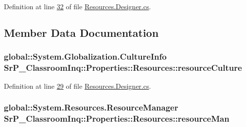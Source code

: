 \-Definition at line \hyperlink{_resources_8_designer_8cs_source_l00032}{32} of file \hyperlink{_resources_8_designer_8cs_source}{\-Resources.\-Designer.\-cs}.



\subsection{\-Member \-Data \-Documentation}
\hypertarget{class_sr_p___classroom_inq_1_1_properties_1_1_resources_a022040216319d6d3cdc26fe2af7fdc7a}{
\subsubsection[{resource\-Culture}]{\setlength{\rightskip}{0pt plus 5cm}global\-::\-System.\-Globalization.\-Culture\-Info {\bf \-Sr\-P\-\_\-\-Classroom\-Inq\-::\-Properties\-::\-Resources\-::resource\-Culture}}}
\label{class_sr_p___classroom_inq_1_1_properties_1_1_resources_a022040216319d6d3cdc26fe2af7fdc7a}


\-Definition at line \hyperlink{_resources_8_designer_8cs_source_l00029}{29} of file \hyperlink{_resources_8_designer_8cs_source}{\-Resources.\-Designer.\-cs}.

\hypertarget{class_sr_p___classroom_inq_1_1_properties_1_1_resources_ae22dad3e6078a39a90778bb00e89e1c6}{
\subsubsection[{resource\-Man}]{\setlength{\rightskip}{0pt plus 5cm}global\-::\-System.\-Resources.\-Resource\-Manager {\bf \-Sr\-P\-\_\-\-Classroom\-Inq\-::\-Properties\-::\-Resources\-::resource\-Man}}}
\label{class_sr_p___classroom_inq_1_1_properties_1_1_resources_ae22dad3e6078a39a90778bb00e89e1c6}


